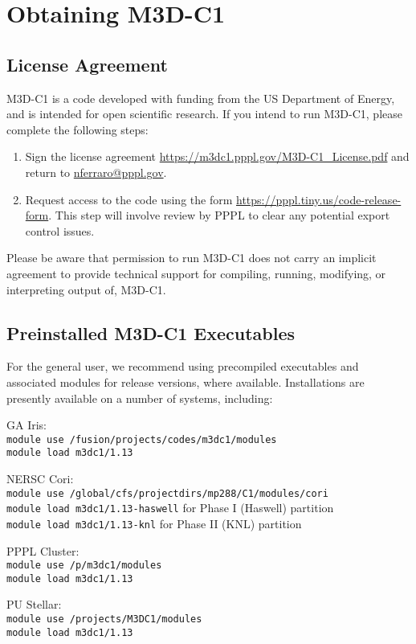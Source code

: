 \section{Obtaining M3D-C1}

\subsection{License Agreement}

M3D-C1 is a code developed with funding from the US Department of
Energy, and is intended for open scientific research.  If you intend
to run M3D-C1, please complete the following steps:

\begin{enumerate}
\item Sign the license agreement
  \url{https://m3dc1.pppl.gov/M3D-C1\_License.pdf} and return to
  \href{mailto:nferraro@pppl.gov}{nferraro@pppl.gov}.
\item Request access to the code using the form
  \url{https://pppl.tiny.us/code-release-form}.  This step will
  involve review by PPPL to clear any potential export control issues.
\end{enumerate}

Please be aware that permission to run M3D-C1 does not carry an
implicit agreement to provide technical support for compiling,
running, modifying, or interpreting output of, M3D-C1.


\subsection{Preinstalled M3D-C1 Executables}

For the general user, we recommend using precompiled executables and
associated modules for release versions, where available.
Installations are presently available on a number of systems,
including:

\begin{description}
\item{GA Iris}:\\
  \texttt{module use /fusion/projects/codes/m3dc1/modules}\\
  \texttt{module load m3dc1/1.13}
\item{NERSC Cori}:\\
  \texttt{module use /global/cfs/projectdirs/mp288/C1/modules/cori}\\
  \texttt{module load m3dc1/1.13-haswell}\quad
  for Phase I (Haswell) partition\\
  \texttt{module load m3dc1/1.13-knl}\quad
  for Phase II (KNL) partition
\item{PPPL Cluster}:\\
  \texttt{module use /p/m3dc1/modules}\\
  \texttt{module load m3dc1/1.13}
\item{PU Stellar}:\\
  \texttt{module use /projects/M3DC1/modules}\\
  \texttt{module load m3dc1/1.13}
\end{description}

